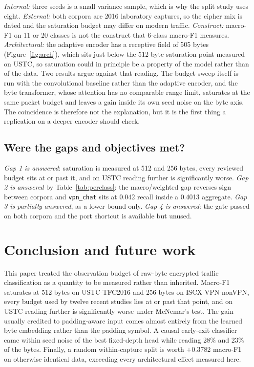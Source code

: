 \documentclass[pdflatex,sn-mathphys-num]{sn-jnl}
\theoremstyle{thmstyleone}%
\theoremstyle{thmstylethree}%
\begin{document}
\emph{Internal:} three seeds is a small variance sample, which is why the
split study uses eight.
\emph{External:} both corpora are 2016 laboratory captures, so the cipher mix
is dated and the saturation budget may differ on modern traffic.
\emph{Construct:} macro-F1 on 11 or 20 classes is not the construct that
6-class macro-F1 measures.
\emph{Architectural:} the adaptive encoder has a receptive field of 505 bytes
(Figure~\ref{fig:arch}), which sits just below the 512-byte saturation point
measured on USTC, so saturation could in principle be a property of the model
rather than of the data. Two results argue against that reading. The budget
sweep itself is run with the convolutional baseline rather than the adaptive
encoder, and the byte transformer, whose attention has no comparable range
limit, saturates at the same packet budget and leaves a gain inside its own
seed noise on the byte axis. The coincidence is therefore not the explanation,
but it is the first thing a replication on a deeper encoder should check.

\subsection{Were the gaps and objectives met?}

\emph{Gap 1 is answered}: saturation is measured at 512 and 256 bytes, every
reviewed budget sits at or past it, and on USTC reading further is
significantly worse. \emph{Gap 2 is answered} by
Table~\ref{tab:perclass}: the macro/weighted gap reverses sign between corpora
and \texttt{vpn\_chat} sits at 0.042 recall inside a 0.4013 aggregate. \emph{Gap 3 is partially answered}, as a lower bound
only. \emph{Gap 4 is answered}: the gate passed on both corpora and the port
shortcut is available but unused.

\section{Conclusion and future work}\label{sec:conclusion}

This paper treated the observation budget of raw-byte encrypted traffic
classification as a quantity to be measured rather than inherited. Macro-F1
saturates at 512 bytes on USTC-TFC2016 and 256 bytes on ISCX VPN-nonVPN, every
budget used by twelve recent studies lies at or past that point, and on USTC
reading further is significantly worse under McNemar's test. The gain usually
credited to padding-aware input comes almost entirely from the learned byte
embedding rather than the padding symbol. A causal early-exit classifier
came within seed noise of the best fixed-depth head while reading 28\% and
23\% of the bytes.
Finally, a random within-capture split is worth $+0.3782$ macro-F1 on otherwise
identical data, exceeding every architectural effect measured here.
\end{document}
